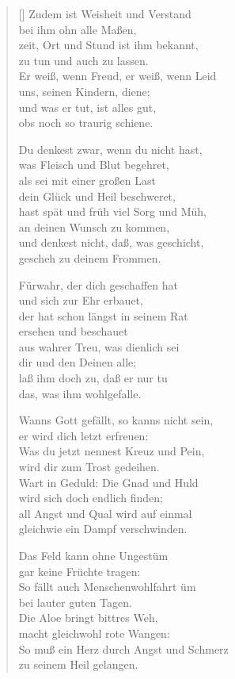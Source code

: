 \begin{multicols}{2}
\begin{verse}[\versewidth]
 Zudem ist Weisheit und Verstand\\
bei ihm ohn alle Maßen,\\
zeit, Ort und Stund ist ihm bekannt,\\
zu tun und auch zu lassen.\\
Er weiß, wenn Freud, er weiß, wenn Leid\\
uns, seinen Kindern, diene;\\
und was er tut, ist alles gut,\\
obs noch so traurig schiene.

 Du denkest zwar, wenn du nicht hast,\\
was Fleisch und Blut begehret,\\
als sei mit einer großen Last\\
dein Glück und Heil beschweret,\\
hast spät und früh viel Sorg und Müh,\\
an deinen Wunsch zu kommen,\\
und denkest nicht, daß, was geschicht,\\
gescheh zu deinem Frommen.

 Fürwahr, der dich geschaffen hat\\
und sich zur Ehr erbauet,\\
der hat schon längst in seinem Rat\\
ersehen und beschauet\\
aus wahrer Treu, was dienlich sei\\
dir und den Deinen alle;\\
laß ihm doch zu, daß er nur tu\\
das, was ihm wohlgefalle.

 Wanns Gott gefällt, so kanns nicht sein,\\
er wird dich letzt erfreuen:\\
Was du jetzt nennest Kreuz und Pein,\\
wird dir zum Trost gedeihen.\\
Wart in Geduld: Die Gnad und Huld\\
wird sich doch endlich finden;\\
all Angst und Qual wird auf einmal\\
gleichwie ein Dampf verschwinden.

 Das Feld kann ohne Ungestüm\\
gar keine Früchte tragen:\\
So fällt auch Menschenwohlfahrt üm\\
bei lauter guten Tagen.\\
Die Aloe bringt bittres Weh,\\
macht gleichwohl rote Wangen:\\
So muß ein Herz durch Angst und Schmerz\\
zu seinem Heil gelangen.


\end{verse}
\end{multicols}

